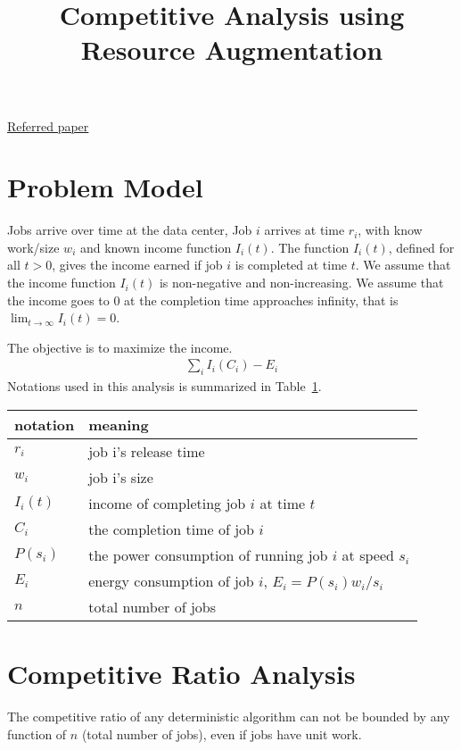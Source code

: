 \documentclass[10 pt,final]{article}
\begin{document}
\title{Competitive Analysis using Resource Augmentation}
\date{}
\maketitle

\href{https://github.com/hxwang/GreenDC-Summary/blob/master/papers/PruhsS10_schedule-energy.md}{Referred paper}


\section{Problem Model}
Jobs arrive over time at the data center, Job $i$ arrives at time $r_i$, with know work/size $w_i$ and known income function $I_i(t)$. The function $I_i(t)$, defined for all $t>0$, gives the income earned if job $i$ is completed at time $t$. We assume that the income function $I_i(t)$ is non-negative and non-increasing. We assume that the income goes to $0$ at the completion time approaches infinity, that is $\lim_{t \to \infty} I_i(t) = 0$.

The objective is to maximize the income.
\begin{align*}
\sum_i I_i(C_i) - E_i
\end{align*}
Notations used in this analysis is summarized in Table~\ref{tb_notation}.

\begin{table}[ht!]
\centering
\begin{tabular}{|l|l|}
\hline
notation & meaning \\ \hline
\hline
$r_i$ & job i's release time \\ \hline
$w_i$ & job i's size \\ \hline
$I_i(t)$ & income of completing job $i$ at time $t$ \\ \hline
$C_i$ & the completion time of job $i$ \\ \hline
$P(s_i)$ & the power consumption of running job $i$ at speed $s_i$ \\ \hline
$E_i$ & energy consumption of job $i$, $E_i = P(s_i)w_i/s_i$ \\ \hline
$n$ & total number of jobs \\ \hline
\end{tabular}
\label{tb_notation}
\end{table}



\section{Competitive Ratio Analysis}
\begin{lemma} The competitive ratio of any deterministic algorithm can not be bounded by any function of $n$ (total number of jobs), even if jobs have unit work.
\end{lemma}
\end{document}
